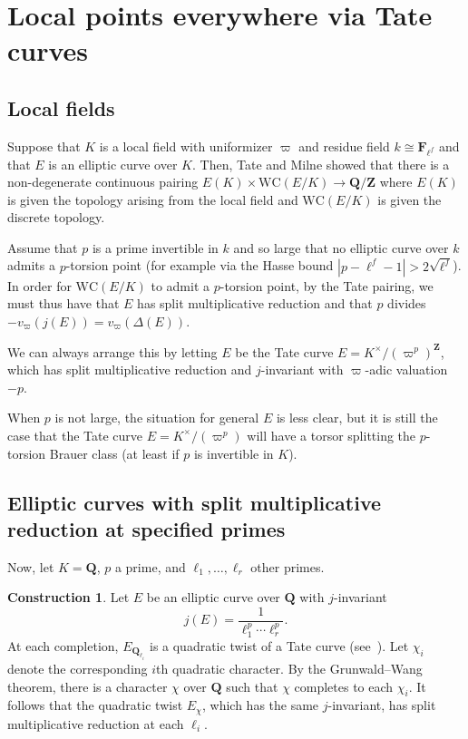 \documentclass[10pt,letterpaper,twoside]{article}
\renewcommand{\1}{\mathbf{1}}
\newcommand{\bF}{\mathbf{F}}
\newcommand{\bQ}{\mathbf{Q}}
\newcommand{\bZ}{\mathbf{Z}}
\newcommand{\WC}{\mathrm{WC}}
\newcommand{\iso}{\cong}
\theoremstyle{plain}
\theoremstyle{plain}
\theoremstyle{definition}
\theoremstyle{named}
\theoremstyle{definition}
\newtheorem{construction}[theorem]{Construction}
\begin{document}
\section{Local points everywhere via Tate curves}

\subsection{Local fields}

Suppose that $K$ is a local field with uniformizer $\varpi$ and residue field $k\iso\bF_{\ell^f}$ and that $E$ is an elliptic curve over $K$. Then, Tate and Milne 
showed that there is a non-degenerate continuous pairing $E(K)\times\WC(E/K)\rightarrow\bQ/\bZ$
where $E(K)$ is given the topology arising from the local field and $\WC(E/K)$ is given the discrete
topology.

Assume that $p$ is a prime invertible in $k$ and so large that no elliptic curve over $k$ admits
a $p$-torsion point (for example via the Hasse bound $|p-\ell^f-1|>2\sqrt{\ell^f}$).
In order for $\WC(E/K)$ to admit a $p$-torsion point, by the Tate pairing, we must thus have that
$E$ has split multiplicative
reduction and that $p$ divides $-v_{\varpi}(j(E))=v_\varpi(\Delta(E))$.

We can always arrange this by letting $E$ be the Tate curve
$E=K^\times/(\varpi^p)^{\bZ}$, which has split multiplicative reduction
and $j$-invariant with $\varpi$-adic valuation $-p$.

When $p$ is not large, the situation for general $E$ is less clear, but it is still the case that the Tate curve
$E=K^\times/(\varpi^p)$ will have a torsor splitting the $p$-torsion Brauer class (at least if $p$
is invertible in $K$).



\subsection{Elliptic curves with split multiplicative reduction at specified primes}

Now, let $K=\bQ$, $p$ a prime, and $\ell_1,\ldots,\ell_r$ other primes.

\begin{construction}\label{const:multiplicative}
    Let $E$ be an elliptic curve over $\bQ$ with $j$-invariant
    $$j(E)=\frac{1}{\ell_1^p\cdots\ell_r^p}.$$
    At each completion, $E_{\bQ_{\ell_i}}$ is a quadratic twist of a Tate curve
    (see~\cite[Thm.~C.14.1]{silverman}). Let $\chi_i$ denote the corresponding $i$th quadratic character. By the
    Grunwald--Wang theorem, there is a character $\chi$ over $\bQ$ such that $\chi$ completes to
    each $\chi_i$. It follows that the quadratic twist $E_\chi$, which has the same $j$-invariant,
    has split multiplicative reduction at each $\ell_i$.
\end{construction}
\end{document}
